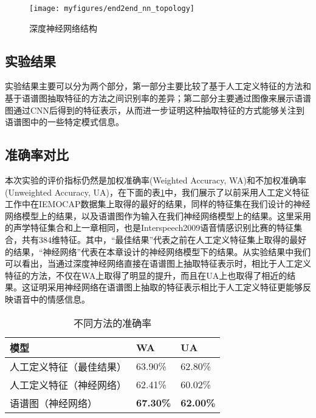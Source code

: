 \begin{figure}[htb] %
    \centering
    \texttt{[image: myfigures/end2end\_nn\_topology]}
    \caption{深度神经网络结构}
    \label{fig:end2end_nn_topology}
\end{figure}

\subsection{实验结果}
\label{ssec:end2end_experiment_result}

实验结果主要可以分为两个部分，第一部分主要比较了基于人工定义特征的方法和基于语谱图抽取特征的方法之间识别率的差异；第二部分主要通过图像来展示语谱图通过CNN后得到的特征表示，从而进一步证明这种抽取特征的方式能够关注到语谱图中的一些特定模式信息。

\subsection{准确率对比}
\label{ssec:end2end_acc_comp}

本次实验的评价指标仍然是加权准确率(Weighted Accuracy, WA)和不加权准确率(Unweighted Accuracy, UA)，在下面的表\ref{tab:acc_end2end}中，我们展示了以前采用人工定义特征工作中在IEMOCAP数据集上取得的最好的结果，同样的特征集在我们设计的神经网络模型上的结果，以及语谱图作为输入在我们神经网络模型上的结果。这里采用的声学特征集合和上一章相同，也是Interspeech2009语音情感识别比赛的特征集合，共有384维特征。其中，“最佳结果”代表之前在人工定义特征集上取得的最好的结果，“神经网络”代表在本章设计的神经网络模型下的结果。从实验结果中我们可以看出，当通过深度神经网络直接在语谱图上抽取特征表示时，相比于人工定义特征的方法，不仅在WA上取得了明显的提升，而且在UA上也取得了相近的结果。这证明采用神经网络在语谱图上抽取的特征表示相比于人工定义特征更能够反映语音中的情感信息。

\begin{table}[htb]
\centering
\begin{minipage}[t]{0.8\linewidth} %
\caption{不同方法的准确率}
\label{tab:acc_end2end}
    \begin{tabularx}{\linewidth}{X<{\centering} X<{\centering} X<{\centering}}
        \toprule[1.5pt]
        模型 & WA & UA \\
        \midrule[1pt]
        人工定义特征（最佳结果） & 63.90\% & 62.80\% \\
        人工定义特征（神经网络） & 62.41\% & 60.02\% \\
        语谱图（神经网络） & \textbf{67.30\%} & \textbf{62.00\%} \\
        \bottomrule[1.5pt]
    \end{tabularx}
\end{minipage}
\end{table}

